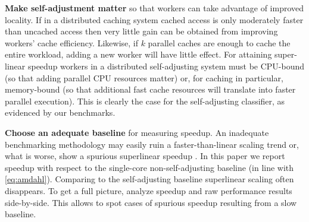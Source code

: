 \noindent%
\textbf{Make self-adjustment matter} so that workers can take advantage of improved locality. If in a distributed caching system cached access is only moderately faster than uncached access then very little gain can be obtained from improving workers' cache efficiency. Likewise, if $k$ parallel caches are enough to cache the entire workload, adding a new worker will have little effect. For attaining super-linear speedup workers in a distributed self-adjusting system must be CPU-bound (so that adding parallel CPU resources matter) or, for caching in particular, memory-bound (so that additional fast cache resources will translate into faster parallel execution). This is clearly the case for the self-adjusting classifier, as evidenced by our benchmarks.

\noindent%
\textbf{Choose an adequate baseline} for measuring speedup. An inadequate benchmarking methodology may easily ruin a faster-than-linear scaling trend or, what is worse, show a spurious superlinear speedup \cite{10.1145/2773212.2789974}. In this paper we report speedup with respect to the single-core non-self-adjusting baseline (in line with \eqref{eq:amdahl}). Comparing to the self-adjusting baseline superlinear scaling often disappears. To get a full picture, analyze speedup and raw performance results side-by-side. This allows to spot cases of spurious speedup resulting from a slow baseline.


